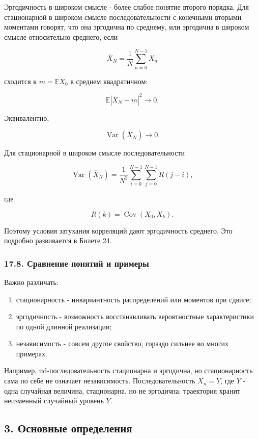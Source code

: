 \documentclass[
  11pt,
  a4paper,
]{article}
\providecommand{\tightlist}{%
  \setlength{\itemsep}{0pt}\setlength{\parskip}{0pt}}
\begin{document}
Эргодичность в широком смысле - более слабое понятие второго порядка.
Для стационарной в широком смысле последовательности с конечными вторыми
моментами говорят, что она эргодична по среднему, или эргодична в
широком смысле относительно среднего, если

\[
\overline X_N
=
\frac1N\sum_{n=0}^{N-1}X_n
\]

сходится к \(m=\mathbb EX_0\) в среднем квадратичном:

\[
\mathbb E|\overline X_N-m|^2\to0.
\]

Эквивалентно,

\[
\operatorname{Var}(\overline X_N)\to0.
\]

Для стационарной в широком смысле последовательности

\[
\operatorname{Var}(\overline X_N)
=
\frac1{N^2}
\sum_{i=0}^{N-1}\sum_{j=0}^{N-1}R(j-i),
\]

где

\[
R(k)=\operatorname{Cov}(X_0,X_k).
\]

Поэтому условия затухания корреляций дают эргодичность среднего. Это
подробно развивается в Билете 24.

\subsubsection{17.8. Сравнение понятий и
примеры}\label{ux441ux440ux430ux432ux43dux435ux43dux438ux435-ux43fux43eux43dux44fux442ux438ux439-ux438-ux43fux440ux438ux43cux435ux440ux44b}

Важно различать:

\begin{enumerate}
\def\labelenumi{\arabic{enumi}.}
\tightlist
\item
  стационарность - инвариантность распределений или моментов при сдвиге;
\item
  эргодичность - возможность восстанавливать вероятностные
  характеристики по одной длинной реализации;
\item
  независимость - совсем другое свойство, гораздо сильнее во многих
  примерах.
\end{enumerate}

Например, iid-последовательность стационарна и эргодична, но
стационарность сама по себе не означает независимость.
Последовательность \(X_n=Y\), где \(Y\) - одна случайная величина,
стационарна, но не эргодична: траектория хранит неизменный случайный
уровень \(Y\).

\subsection{3. Основные
определения}\label{ux43eux441ux43dux43eux432ux43dux44bux435-ux43eux43fux440ux435ux434ux435ux43bux435ux43dux438ux44f}
\end{document}
